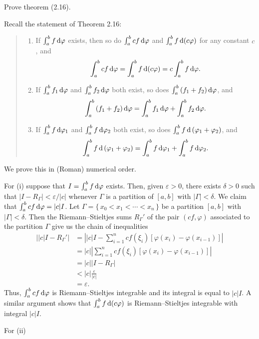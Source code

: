 \begin{problem}
  Prove theorem (2.16).
\end{problem}
\begin{solution}
  Recall the statement of Theorem 2.16:
  \begin{quote}
    \begin{enumerate}[label=(\roman*),noitemsep]
    \item If $\int_a^b f\mathop{}\!\mathrm{d}\varphi$ exists, then so do
      $\int_a^bcf\mathop{}\!\mathrm{d}\varphi$ and $\int_a^b f\mathop{}\!\mathrm{d}(c\varphi)$ for any
      constant $c$, and
      \[
        \int_a^bcf\mathop{}\!\mathrm{d}\varphi=\int_a^bf\mathop{}\!\mathrm{d}(c\varphi)=c\int_a^bf\mathop{}\!\mathrm{d}\varphi.
      \]
    \item If $\int_a^b f_1\mathop{}\!\mathrm{d}\varphi$ and $\int_a^bf_2\mathop{}\!\mathrm{d}\varphi$ both
      exist, so does $\int_a^b\left(f_1+f_2\right)\mathop{}\!\mathrm{d}\varphi$, and
      \[
        \int_a^b\left(f_1+f_2\right)\mathop{}\!\mathrm{d}\varphi=\int_a^bf_1\mathop{}\!\mathrm{d}\varphi+\int_a^bf_2\mathop{}\!\mathrm{d}\varphi.
      \]
    \item If $\int_a^bf\mathop{}\!\mathrm{d}\varphi_1$ and $\int_a^bf\mathop{}\!\mathrm{d}\varphi_2$ both
      exist, so does $\int_a^bf\mathop{}\!\mathrm{d}\left(\varphi_1+\varphi_2\right)$, and
      \[
        \int_a^bf\mathop{}\!\mathrm{d}\left(\varphi_1+\varphi_2\right)=\int_a^bf\mathop{}\!\mathrm{d}\varphi_1+\int_a^bf\mathop{}\!\mathrm{d}\varphi_2.
      \]
    \end{enumerate}
  \end{quote}
  \noindent%
  We prove this in (Roman) numerical order.


  For (i) suppose that $I=\int_a^bf\mathop{}\!\mathrm{d}\varphi$ exists. Then, given
  $\varepsilon>0$, there exists $\delta>0$ such that
  $|I-R_\Gamma|<\varepsilon/|c|$ whenever $\Gamma$ is a partition of
  $[a,b]$ with $|\Gamma|<\delta$. We claim that
  $\int_a^b cf\mathop{}\!\mathrm{d}\varphi=|c|I$. Let $\Gamma=\{\,x_0<x_1<\cdots<x_n\,\}$
  be a partition $[a,b]$ with $|\Gamma|<\delta$. Then the
  Riemann--Stieltjes sums $R_\Gamma'$ of the pair $(cf,\varphi)$ associated
  to the partition $\Gamma$ give us the chain of inequalities
  \begin{align*}
    ||c|I-R_\Gamma'|
    &=\left| |c|I-
      \sum_{i=1}^n cf(\xi_i)[\varphi(x_i)-\varphi(x_{i-1})]
      \right|\\
    &=|c|\left|
      \sum_{i=1}^n cf(\xi_i)[\varphi(x_i)-\varphi(x_{i-1})]
      \right|\\
    &=|c||I-R_\Gamma|\\
    &<|c|\frac{\varepsilon}{|c|}\\
    &=\varepsilon.
  \end{align*}
  Thus, $\int_a^b cf\mathop{}\!\mathrm{d}\varphi$ is Riemann--Stieltjes integrable and its
  integral is equal to $|c|I$. A similar argument shows that
  $\int_a^b f\mathop{}\!\mathrm{d}(c\varphi)$ is Riemann--Stieltjes integrable with
  integral $|c|I$.

  For (ii)
\end{solution}

